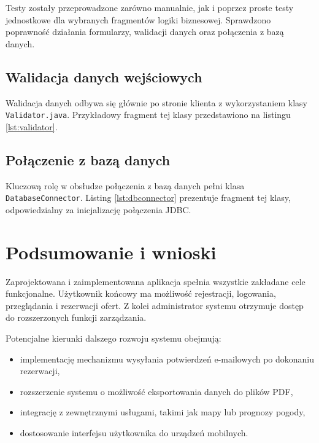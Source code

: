 Testy zostały przeprowadzone zarówno manualnie, jak i poprzez proste testy jednostkowe dla wybranych fragmentów logiki biznesowej. Sprawdzono poprawność działania formularzy, walidacji danych oraz połączenia z bazą danych.

\subsection{Walidacja danych wejściowych}

Walidacja danych odbywa się głównie po stronie klienta z wykorzystaniem klasy \texttt{Validator.java}. Przykładowy fragment tej klasy przedstawiono na listingu \ref{lst:validator}.



\subsection{Połączenie z bazą danych}

Kluczową rolę w obsłudze połączenia z bazą danych pełni klasa \texttt{DatabaseConnector}. Listing \ref{lst:dbconnector} prezentuje fragment tej klasy, odpowiedzialny za inicjalizację połączenia JDBC.



\section{Podsumowanie i wnioski}

Zaprojektowana i zaimplementowana aplikacja spełnia wszystkie zakładane cele funkcjonalne. Użytkownik końcowy ma możliwość rejestracji, logowania, przeglądania i rezerwacji ofert. Z kolei administrator systemu otrzymuje dostęp do rozszerzonych funkcji zarządzania.

Potencjalne kierunki dalszego rozwoju systemu obejmują:

\begin{itemize}
    \item implementację mechanizmu wysyłania potwierdzeń e-mailowych po dokonaniu rezerwacji,
    \item rozszerzenie systemu o możliwość eksportowania danych do plików PDF,
    \item integrację z zewnętrznymi usługami, takimi jak mapy lub prognozy pogody,
    \item dostosowanie interfejsu użytkownika do urządzeń mobilnych.
\end{itemize}

